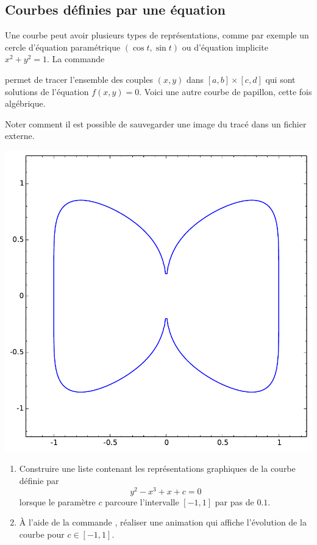 \documentclass[class=report,crop=false]{standalone}
\begin{document}
\subsection{Courbes définies par une équation}

Une courbe peut avoir plusieurs types de représentations, comme par exemple
un cercle d'équation paramétrique $(\cos t,\sin t)$ ou d'équation implicite
$x^2+y^2 = 1$.
La commande \\
\centerline{ }
permet de tracer l'ensemble des couples $(x,y)$ 
dans $[a,b]\times[c,d]$ qui sont solutions de l'équation 
$f(x,y)=0$. Voici une autre courbe de papillon, cette fois algébrique. 



Noter comment il est possible de sauvegarder une image du tracé dans un fichier externe.


\begin{center}
  \includegraphics[scale=0.4]{figures/butterfly_curve_algebraic}
\end{center}

\begin{tp}
\sauteligne
\begin{enumerate}
  \item Construire une liste contenant les représentations graphiques de la courbe définie par
  $$y^2-x^3+x+c = 0$$
  lorsque le paramètre $c$ parcoure l'intervalle $[-1, 1]$ par pas de $0.1$.
  \item \`A l'aide de la commande , 
  réaliser une animation qui affiche l'évolution de la courbe
  pour $c \in[-1,1]$.
\end{enumerate}
\end{tp}
\end{document}

